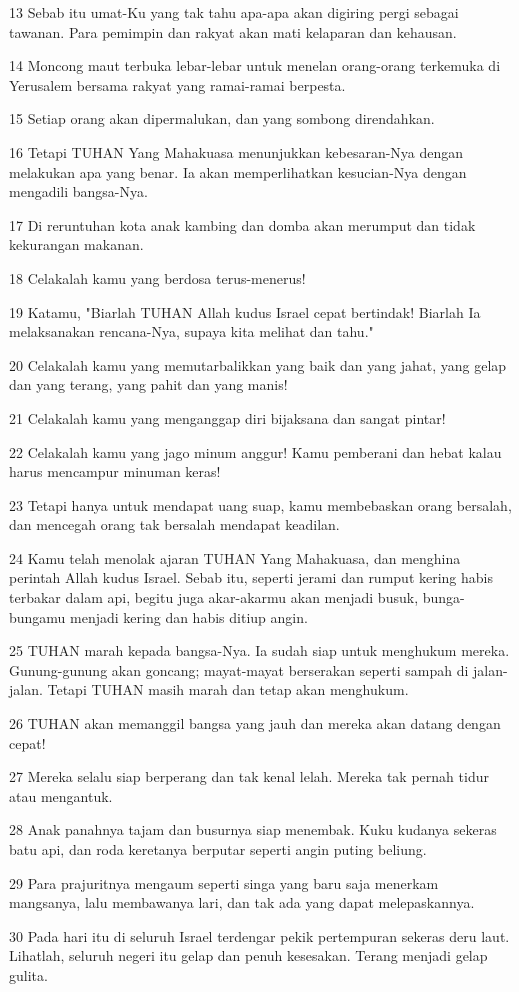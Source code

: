 \par 13 Sebab itu umat-Ku yang tak tahu apa-apa akan digiring pergi sebagai tawanan. Para pemimpin dan rakyat akan mati kelaparan dan kehausan.
\par 14 Moncong maut terbuka lebar-lebar untuk menelan orang-orang terkemuka di Yerusalem bersama rakyat yang ramai-ramai berpesta.
\par 15 Setiap orang akan dipermalukan, dan yang sombong direndahkan.
\par 16 Tetapi TUHAN Yang Mahakuasa menunjukkan kebesaran-Nya dengan melakukan apa yang benar. Ia akan memperlihatkan kesucian-Nya dengan mengadili bangsa-Nya.
\par 17 Di reruntuhan kota anak kambing dan domba akan merumput dan tidak kekurangan makanan.
\par 18 Celakalah kamu yang berdosa terus-menerus!
\par 19 Katamu, "Biarlah TUHAN Allah kudus Israel cepat bertindak! Biarlah Ia melaksanakan rencana-Nya, supaya kita melihat dan tahu."
\par 20 Celakalah kamu yang memutarbalikkan yang baik dan yang jahat, yang gelap dan yang terang, yang pahit dan yang manis!
\par 21 Celakalah kamu yang menganggap diri bijaksana dan sangat pintar!
\par 22 Celakalah kamu yang jago minum anggur! Kamu pemberani dan hebat kalau harus mencampur minuman keras!
\par 23 Tetapi hanya untuk mendapat uang suap, kamu membebaskan orang bersalah, dan mencegah orang tak bersalah mendapat keadilan.
\par 24 Kamu telah menolak ajaran TUHAN Yang Mahakuasa, dan menghina perintah Allah kudus Israel. Sebab itu, seperti jerami dan rumput kering habis terbakar dalam api, begitu juga akar-akarmu akan menjadi busuk, bunga-bungamu menjadi kering dan habis ditiup angin.
\par 25 TUHAN marah kepada bangsa-Nya. Ia sudah siap untuk menghukum mereka. Gunung-gunung akan goncang; mayat-mayat berserakan seperti sampah di jalan-jalan. Tetapi TUHAN masih marah dan tetap akan menghukum.
\par 26 TUHAN akan memanggil bangsa yang jauh dan mereka akan datang dengan cepat!
\par 27 Mereka selalu siap berperang dan tak kenal lelah. Mereka tak pernah tidur atau mengantuk.
\par 28 Anak panahnya tajam dan busurnya siap menembak. Kuku kudanya sekeras batu api, dan roda keretanya berputar seperti angin puting beliung.
\par 29 Para prajuritnya mengaum seperti singa yang baru saja menerkam mangsanya, lalu membawanya lari, dan tak ada yang dapat melepaskannya.
\par 30 Pada hari itu di seluruh Israel terdengar pekik pertempuran sekeras deru laut. Lihatlah, seluruh negeri itu gelap dan penuh kesesakan. Terang menjadi gelap gulita.

